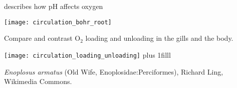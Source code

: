 \documentclass[t,handout]{beamer}  %
\begin{document}
\begin{frame}[c,plain]{ describes how pH affects oxygen }

	\centering
	\texttt{[image: circulation\_bohr\_root]}
	\pause
	

\end{frame}


\begin{frame}[c,plain]{Compare and contrast O$_2$ loading and unloading in the gills and the body.}

	\vspace{\baselineskip}
	\texttt{[image: circulation\_loading\_unloading]}
	\vskip0pt plus 1filll

\hfill\tiny\textit{Enoplosus armatus} (Old Wife, Enoplosidae:Perciformes), Richard Ling, Wikimedia Commons.
\end{frame}
\end{document}

